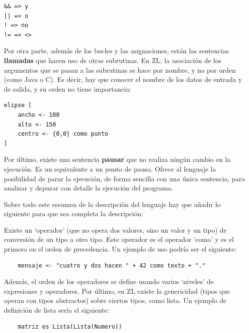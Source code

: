 \documentclass{report}
\begin{document}
\begin{BVerbatim}
&& => y 
|| => o
! => no 
!= => <>
\end{BVerbatim} 

	\vspace{10px} 
	
	Por otra parte, además de los bucles y las asignaciones, están las sentencias \textbf{llamadas} que hacen uso de otras subrutinas. En ZL, la asociación de los argumentos que se pasan a las subrutinas se hace por nombre, y no por orden (como Java o C). Es decir, hay que conocer el nombre de los datos de entrada y de salida, y su orden no tiene importancia:
	
	\vspace{10px}
	
\begin{BVerbatim}
elipse [
	ancho <- 100
	alto <- 150
	centro <- {0,0} como punto
]
\end{BVerbatim}	

	\vspace{10px}

	Por último, existe una sentencia \textbf{pausar} que no realiza ningún cambio en la ejecución. Es un equivalente a un punto de pausa. Ofrece al lenguaje la posibilidad de parar la ejecución, de forma sencilla con una única sentencia, para analizar y depurar con detalle la ejecución del programa.
	
	\vspace{10px}
	
	Sobre todo este resumen de la descripción del lenguaje hay que añadir lo siguiente para que sea completa la descripción:
	
		
	\noindent Existe un `operador' (que no opera dos valores, sino un valor y un tipo) de conversión de un tipo a otro tipo. Este operador es el operador `como' y es el primero en el orden de precedencia. Un ejemplo de uso podría ser el siguiente:
	
	\begin{BVerbatim}
	mensaje <- "cuatro y dos hacen " + 42 como texto + "."
	\end{BVerbatim} 
	
	Además, el orden de los operadores se define usando varios `niveles' de expresiones y operadores.
	Por último, en ZL existe la genericidad (tipos que operan con tipos abstractos) sobre ciertos tipos, como lista. Un ejemplo de definición de lista sería el siguiente:
	
\begin{BVerbatim}
	matriz es Lista(Lista(Numero))
\end{BVerbatim}
\end{document}
